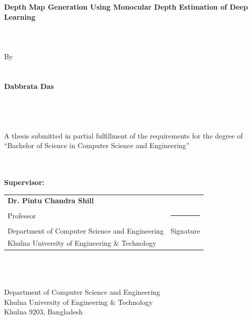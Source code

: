 \documentclass[a4paper,12pt,oneside]{book}
\newcommand{\blanklineR}{\hfill \\} %
\begin{document}
 \label{declar}
\begin{center}
\textbf{\fontsize{18}{27}\selectfont Depth Map Generation Using Monocular Depth Estimation of Deep Learning\\}
\blanklineR\blanklineR\blanklineR
By\\
\blanklineR\blanklineR
\textbf{Dabbrata Das}\\
\blanklineR\blanklineR\blanklineR\blanklineR
A thesis submitted in partial fulfillment of the requirements for the degree of \\
“Bachelor of Science in Computer Science and Engineering”\\
\blanklineR\blanklineR
\begin{flushleft}
        {\fontsize{12}{18} \textbf{Supervisor:}}
        \begin{tabular}{p{12cm} p{4cm}}
                \hspace{0.8 in}\textbf{Dr. Pintu Chandra Shill}                &                                \\
                \hspace{0.8 in}Professor                                      & \multicolumn{1}{l}{\rule{1.1in}{\arrayrulewidth}}          \\
                \hspace{0.8 in}Department of Computer Science and Engineering & \multicolumn{1}{l}{\hspace{16pt}Signature} \\
                \hspace{0.8 in}Khulna University of Engineering \& Technology & \vspace{36pt}
            \end{tabular}
    \end{flushleft}

\blanklineR\blanklineR\blanklineR
Department of Computer Science and Engineering \\
Khulna University of Engineering \& Technology\\
Khulna 9203, Bangladesh\\
\end{center}

\end{document}
